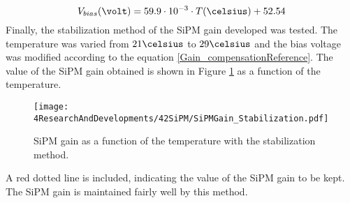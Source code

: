 \begin{equation}
V_{bias}(\volt)= 59.9 \cdot{} 10^{-3} \cdot{} T(\celsius) + 52.54
\label{Gain_compensationReference}
\end{equation}  
Finally, the stabilization method of the SiPM gain developed was tested. The temperature was varied from $21\celsius$ to $29\celsius$ and the bias voltage was modified according to the equation \ref{Gain_compensationReference}. The value of the SiPM gain obtained is shown in Figure \ref{fig:SiPMGainStabilization} as a function of the temperature.

\begin{figure}[hbtp]
\centering
\texttt{[image: 4ResearchAndDevelopments/42SiPM/SiPMGain\_Stabilization.pdf]}
\caption{SiPM gain as a function of the temperature with the stabilization method. \label{fig:SiPMGainStabilization}}
\end{figure}

A red dotted line is included, indicating the value of the SiPM gain to be kept. The SiPM gain is maintained fairly well by this method.